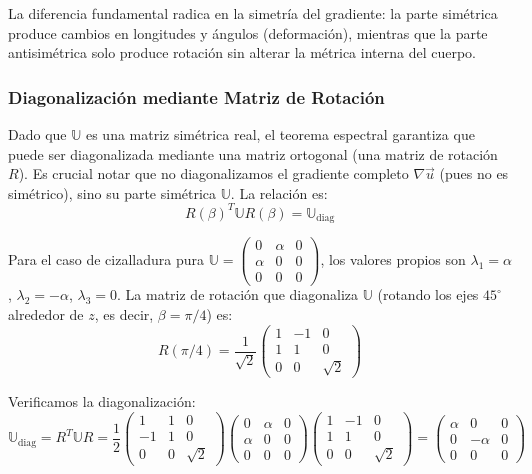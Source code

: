La diferencia fundamental radica en la simetría del gradiente: la parte simétrica produce cambios en longitudes y ángulos (deformación), mientras que la parte antisimétrica solo produce rotación sin alterar la métrica interna del cuerpo.

\subsubsection{Diagonalización mediante Matriz de Rotación}

Dado que $\mathbb{U}$ es una matriz simétrica real, el teorema espectral garantiza que puede ser diagonalizada mediante una matriz ortogonal (una matriz de rotación $R$). Es crucial notar que no diagonalizamos el gradiente completo $\nabla\vec{u}$ (pues no es simétrico), sino su parte simétrica $\mathbb{U}$. La relación es:
$$ R(\beta)^T \mathbb{U} R(\beta) = \mathbb{U}_{\text{diag}} $$

Para el caso de cizalladura pura $\mathbb{U} = \begin{pmatrix} 0 & \alpha & 0 \\ \alpha & 0 & 0 \\ 0 & 0 & 0 \end{pmatrix}$, los valores propios son $\lambda_1 = \alpha$, $\lambda_2 = -\alpha$, $\lambda_3 = 0$. La matriz de rotación que diagonaliza $\mathbb{U}$ (rotando los ejes $45^\circ$ alrededor de $z$, es decir, $\beta = \pi/4$) es:
$$ R(\pi/4) = \frac{1}{\sqrt{2}} \begin{pmatrix} 1 & -1 & 0 \\ 1 & 1 & 0 \\ 0 & 0 & \sqrt{2} \end{pmatrix} $$

Verificamos la diagonalización:
$$ \mathbb{U}_{\text{diag}} = R^T \mathbb{U} R = \frac{1}{2} \begin{pmatrix} 1 & 1 & 0 \\ -1 & 1 & 0 \\ 0 & 0 & \sqrt{2} \end{pmatrix} \begin{pmatrix} 0 & \alpha & 0 \\ \alpha & 0 & 0 \\ 0 & 0 & 0 \end{pmatrix} \begin{pmatrix} 1 & -1 & 0 \\ 1 & 1 & 0 \\ 0 & 0 & \sqrt{2} \end{pmatrix} = \begin{pmatrix} \alpha & 0 & 0 \\ 0 & -\alpha & 0 \\ 0 & 0 & 0 \end{pmatrix} $$

